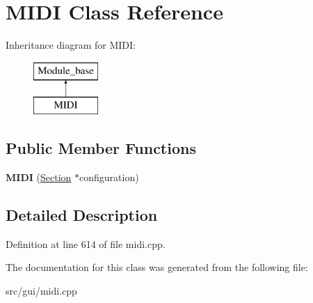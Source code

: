 \hypertarget{classMIDI}{\section{M\-I\-D\-I Class Reference}
\label{classMIDI}
}
Inheritance diagram for M\-I\-D\-I\-:\begin{figure}[H]
\begin{center}
\leavevmode
\includegraphics[height=2.000000cm]{classMIDI}
\end{center}
\end{figure}
\subsection*{Public Member Functions}
\begin{DoxyCompactItemize}
\item 
\hypertarget{classMIDI_a0391b055740242a2cb9fb8d45d85411f}{{\bfseries M\-I\-D\-I} (\hyperlink{classSection}{Section} $\ast$configuration)}\label{classMIDI_a0391b055740242a2cb9fb8d45d85411f}

\end{DoxyCompactItemize}


\subsection{Detailed Description}


Definition at line 614 of file midi.\-cpp.



The documentation for this class was generated from the following file\-:\begin{DoxyCompactItemize}
\item 
src/gui/midi.\-cpp\end{DoxyCompactItemize}
